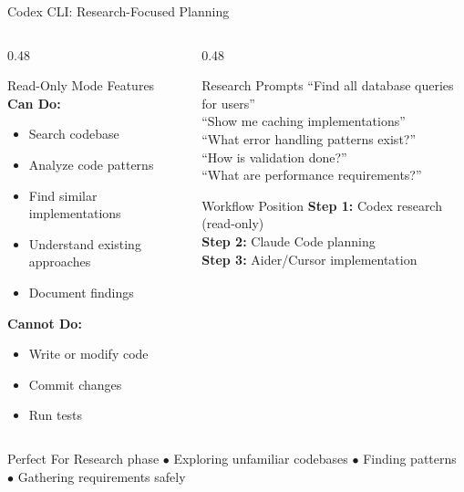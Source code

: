 \documentclass[aspectratio=169,10pt]{beamer}
\begin{document}
\begin{frame}{Codex CLI: Research-Focused Planning}
    \begin{columns}[T]
        \begin{column}{0.48\textwidth}
            \begin{block}{Read-Only Mode Features}
                \textbf{Can Do:}
                \begin{itemize}
                    \item Search codebase
                    \item Analyze code patterns
                    \item Find similar implementations
                    \item Understand existing approaches
                    \item Document findings
                \end{itemize}
                \textbf{Cannot Do:}
                \begin{itemize}
                    \item Write or modify code
                    \item Commit changes
                    \item Run tests
                \end{itemize}
            \end{block}
        \end{column}
        \begin{column}{0.48\textwidth}
            \begin{exampleblock}{Research Prompts}
                ``Find all database queries for users''\\
                ``Show me caching implementations''\\
                ``What error handling patterns exist?''\\
                ``How is validation done?''\\
                ``What are performance requirements?''
            \end{exampleblock}
            \begin{block}{Workflow Position}
                \textbf{Step 1:} Codex research (read-only)\\
                \textbf{Step 2:} Claude Code planning\\
                \textbf{Step 3:} Aider/Cursor implementation
            \end{block}
        \end{column}
    \end{columns}
    \vspace{0.2cm}
    \begin{block}{Perfect For}
        Research phase $\bullet$ Exploring unfamiliar codebases $\bullet$ Finding patterns $\bullet$ Gathering requirements safely
    \end{block}

\end{frame}
\end{document}
